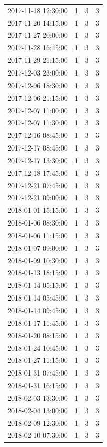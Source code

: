 \begin{tabular}{lrrr}
2017-11-18 12:30:00 & 1 & 3 & 3 \\
2017-11-20 14:15:00 & 1 & 3 & 3 \\
2017-11-27 20:00:00 & 1 & 3 & 3 \\
2017-11-28 16:45:00 & 1 & 3 & 3 \\
2017-11-29 21:15:00 & 1 & 3 & 3 \\
2017-12-03 23:00:00 & 1 & 3 & 3 \\
2017-12-06 18:30:00 & 1 & 3 & 3 \\
2017-12-06 21:15:00 & 1 & 3 & 3 \\
2017-12-07 11:00:00 & 1 & 3 & 3 \\
2017-12-07 11:30:00 & 1 & 3 & 3 \\
2017-12-16 08:45:00 & 1 & 3 & 3 \\
2017-12-17 08:45:00 & 1 & 3 & 3 \\
2017-12-17 13:30:00 & 1 & 3 & 3 \\
2017-12-18 17:45:00 & 1 & 3 & 3 \\
2017-12-21 07:45:00 & 1 & 3 & 3 \\
2017-12-21 09:00:00 & 1 & 3 & 3 \\
2018-01-01 15:15:00 & 1 & 3 & 3 \\
2018-01-06 08:30:00 & 1 & 3 & 3 \\
2018-01-06 11:15:00 & 1 & 3 & 3 \\
2018-01-07 09:00:00 & 1 & 3 & 3 \\
2018-01-09 10:30:00 & 1 & 3 & 3 \\
2018-01-13 18:15:00 & 1 & 3 & 3 \\
2018-01-14 05:15:00 & 1 & 3 & 3 \\
2018-01-14 05:45:00 & 1 & 3 & 3 \\
2018-01-14 09:45:00 & 1 & 3 & 3 \\
2018-01-17 11:45:00 & 1 & 3 & 3 \\
2018-01-20 08:15:00 & 1 & 3 & 3 \\
2018-01-24 10:45:00 & 1 & 3 & 3 \\
2018-01-27 11:15:00 & 1 & 3 & 3 \\
2018-01-31 07:45:00 & 1 & 3 & 3 \\
2018-01-31 16:15:00 & 1 & 3 & 3 \\
2018-02-03 13:30:00 & 1 & 3 & 3 \\
2018-02-04 13:00:00 & 1 & 3 & 3 \\
2018-02-09 12:30:00 & 1 & 3 & 3 \\
2018-02-10 07:30:00 & 1 & 3 & 3 \\

\end{tabular}
